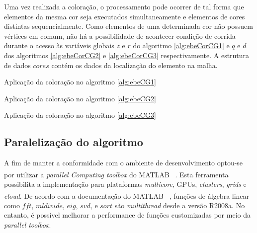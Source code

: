 \documentclass[
    12pt,               %
    openright,          %
    oneside,
    a4paper,            %
    english,            %
    french,             %
    spanish,            %
    brazil              %
    ]{abntex2}
\newcommand{\matlab}{MATLAB\textsuperscript{\textregistered} \ }
\begin{document}
Uma vez realizada a coloração, o processamento pode ocorrer de tal forma que elementos da mesma cor seja executados simultaneamente e elementos de cores distintas sequencialmente. Como elementos de uma determinada cor não possuem vértices em comum, não há a possibilidade de acontecer condição de corrida durante o acesso às variáveis globais $z$ e  $r$ do algoritmo \ref{alg:ebeCorCG1} e $q$ e $d$ dos algoritmos \ref{alg:ebeCorCG2} e \ref{alg:ebeCorCG3} respectivamente. A estrutura de dados $cores$ contém os dados da localização do elemento na malha.

\begin{algorithm}	
	\caption{\label{alg:ebeCorCG1}Aplicação da coloração no algoritmo \ref{alg:ebeCG1}} 
	\begin{algorithmic}[1]
		\EndFor
		\EndFor
	\end{algorithmic}
\end{algorithm}

\begin{algorithm}	
	\caption{\label{alg:ebeCorCG2}Aplicação da coloração no algoritmo \ref{alg:ebeCG2}} 
	\begin{algorithmic}[1]
		\EndFor
		\EndFor
	\end{algorithmic}
\end{algorithm}

\begin{algorithm}	
	\caption{\label{alg:ebeCorCG3}Aplicação da coloração no algoritmo \ref{alg:ebeCG3}} 
	\begin{algorithmic}[1]
		\EndFor
		\EndFor
	\end{algorithmic}
\end{algorithm}

\subsection{Paralelização do algoritmo}
A fim de manter a conformidade com o ambiente de desenvolvimento optou-se por utilizar a \textit{parallel Computing toolbox} do \matlab. Esta ferramenta possibilita a implementação para plataformas \textit{multicore}, GPUs, \textit{clusters}, \textit{grids} e \textit{cloud}. De acordo com a documentação do \matlab \nocite{matMulticore}, funções de álgebra linear como $fft$, $mldivide$, $eig$, $svd$, e $sort$
são \textit{multithread} desde a versão R2008a. No entanto, é possível melhorar a performance de funções customizadas por meio da \textit{parallel toolbox}.
\end{document}
